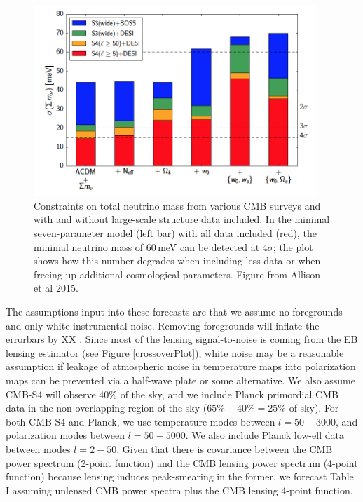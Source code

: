 \begin{figure}[h]
\centering
\includegraphics[width=0.95\textwidth]{CMBLensing/Allisonetal.png}
\caption{Constraints on total neutrino mass from various CMB surveys  and with and without large-scale structure data included.   In the minimal seven-parameter model (left bar) with all data included (red), the minimal neutrino mass of 60\,meV can be detected at 4$\sigma$; the plot shows how this number degrades when including less data or when freeing up additional cosmological parameters. Figure from Allison et al 2015.} 
\label{nuForecasts}
\end{figure}



The assumptions input into these forecasts are that we assume no foregrounds and only white instrumental noise.  Removing foregrounds will inflate the errorbars by XX .  Since most of the lensing signal-to-noise is coming from the EB lensing estimator (see Figure \ref{crossoverPlot}), white noise may be a reasonable assumption if leakage of atmospheric noise in temperature maps into polarization maps can be prevented via a half-wave plate or some alternative.  We also assume CMB-S4 will observe $40\%$ of the sky, and we include Planck primordial CMB data in the non-overlapping region of the sky ($65\% - 40\% = 25\%$ of sky).  For both CMB-S4 and Planck, we use temperature modes between $l=50-3000$, and polarization modes between $l=50-5000$.  We also include Planck low-ell data between modes $l=2-50$.  Given that there is covariance between the CMB power spectrum (2-point function) and the CMB lensing power spectrum (4-point function) because lensing induces peak-smearing in the former, we forecast Table I assuming unlensed CMB power spectra plus the CMB lensing 4-point function.    


